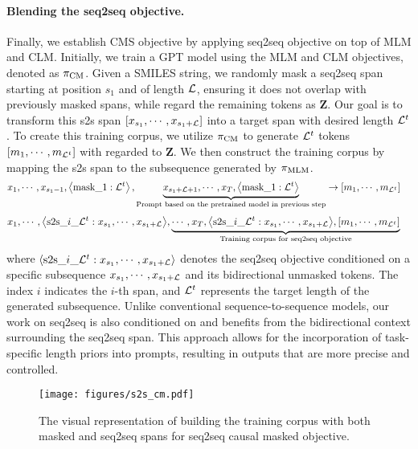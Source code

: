 \paragraph{Blending the seq2seq objective.} 
Finally, we establish CMS objective by applying seq2seq objective on top of MLM and CLM. Initially, we train a GPT model using the MLM and CLM objectives, denoted as $\pi_{\text{CM}}$.
Given a SMILES string, we randomly mask a seq2seq span starting at position $s_1$ and of length $\mathcal{L}$, ensuring it does not overlap with previously masked spans, while regard the remaining tokens as $\mathbf{Z}$. Our goal is to transform this s2s span $\left[x_{s_1}, \cdots, x_{s_1+\mathcal{L}}\right]$ into a target span with desired length $\mathcal{L}^t$. To create this training corpus, we utilize $\pi_{\text{CM}}$ to generate $\mathcal{L}^t$ tokens $\left[m_{1}, \cdots, m_{\mathcal{L}^t}\right]$ with regarded to $\mathbf{Z}$. We then construct the training corpus by mapping the s2s span to the subsequence generated by $\pi_{\text{MLM}}$.
\begin{align}
&x_1,\cdots,x_{s_1-1}, \left\langle \text{mask}\_1:\mathcal{L}^t \right\rangle, 
\underbrace{x_{s_1+ \mathcal{L} +1 },\cdots, {\color{black}{x_{\ensuremath{T}}, \ensuremath{\left\langle \text{mask}\_1:\mathcal{L}^t \right\rangle}}}}_{\text{Prompt based on the pretrained model in previous step}}
\rightarrow[m_1,\cdots,m_{\mathcal{L}^t}] \nonumber
\end{align}
\begin{align}
&x_1,\cdots,{\left\langle \text{s2s}\_i\_\mathcal{L}^t:x_{s_1},\cdots,x_{s_1+\mathcal{L}} \right\rangle},
\underbrace{\cdots, {\color{black}x_{T}, {\left\langle \text{s2s}\_i\_\mathcal{L}^t:x_{s_1},\cdots,x_{s_1+\mathcal{L}} \right\rangle},[m_1,\cdots,m_{\mathcal{L}^t}]}}_{\text{Training corpus for seq2seq objective}} \nonumber
\end{align}
where ${\left\langle \text{s2s}\_i\_\mathcal{L}^t:x_{s_1},\cdots,x_{s_1+\mathcal{L}} \right\rangle}$ denotes the seq2seq objective conditioned on a specific subsequence $x_{s_1},\cdots,x_{s_1+\mathcal{L}}$ and its bidirectional unmasked tokens. 
The index $i$ indicates the $i$-th span, and $\mathcal{L}^t$ represents the target length of the generated subsequence. 
Unlike conventional sequence-to-sequence models, our work on seq2seq is also conditioned on and benefits from the bidirectional context surrounding the seq2seq span.
This approach allows for the incorporation of task-specific length priors into prompts, resulting in outputs that are more precise and controlled.


\begin{figure}[!ht]
    \centering
    \texttt{[image: figures/s2s\_cm.pdf]}
    \caption
    {The visual representation of building the training corpus with both masked and seq2seq spans for seq2seq causal masked objective. }
    \label{fig:s2s_cm}
\end{figure}



























